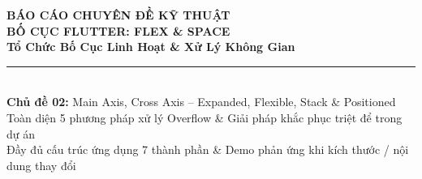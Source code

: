 \documentclass[aspectratio=169, 10pt]{beamer}
\begin{document}
\begin{frame}
  \vspace{0.75cm}
  \centering
  {\textcolor{AccentOrange}{\textbf{\footnotesize BÁO CÁO CHUYÊN ĐỀ KỸ THUẬT}}}\\[0.32cm]
  {\Huge \textbf{\textcolor{NavyTitle}{BỐ CỤC FLUTTER: FLEX \& SPACE}}}\\[0.20cm]
  {\LARGE \textbf{\textcolor{NavyTitle}{Tổ Chức Bố Cục Linh Hoạt \& Xử Lý Không Gian}}}\\[0.40cm]
  {\color{AccentOrange}\rule{5.2cm}{1.3pt}}\\[0.50cm]

  {\large \textbf{Chủ đề 02:} Main Axis, Cross Axis -- Expanded, Flexible, Stack \& Positioned}\\[0.18cm]
  {\normalsize Toàn diện 5 phương pháp xử lý Overflow \& Giải pháp khắc phục triệt để trong dự án}\\[0.45cm]

  {\small Đầy đủ cấu trúc ứng dụng 7 thành phần \& Demo phản ứng khi kích thước / nội dung thay đổi}
\end{frame}
\end{document}
